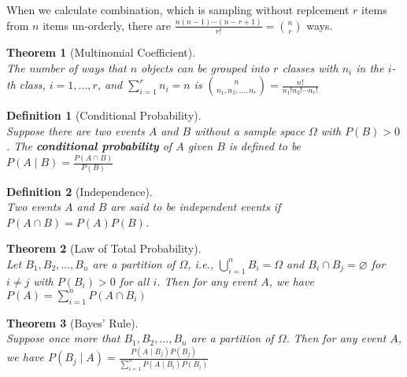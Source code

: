 \documentclass[12pt]{article}
\newtheorem{definition}{Definition}[section]
\newtheorem{theorem}{Theorem}[section]
\theoremstyle{definition}
\begin{document}
When we calculate combination, which is sampling without replcement $r$ items from $n$ items un-orderly,
there are
$
\frac{n(n-1)\cdots(n-r+1)}{r!}=\binom{n}{r}
$
ways.
\begin{theorem}[Multinomial Coefficient]
\hfill\\\normalfont The number of ways that $n$ objects can be grouped into $r$ classes with $n_i$ in the $i$-th class, $i=1,\ldots, r$, and $\sum_{i=1}^r n_i=n$ is
$
\binom{n}{n_1,n_2,\ldots, n_r} = \frac{n!}{n_1!n_2!\cdots n_r!}
$
\end{theorem}
\begin{definition}[Conditional Probability]
\hfill\\\normalfont Suppose there are two events $A$ and $B$ without a sample space $\Omega$ with $P(B)>0$. The \textbf{conditional probability} of $A$ given $B$ is defined to be
$
P(A\mid B) = \frac{P(A\cap B)}{P(B)}
$
\end{definition}
\begin{definition}[Independence]
\hfill\\\normalfont Two events $A$ and $B$ are said to be independent events if $P(A\cap B)=P(A)P(B)$.
\end{definition}
\begin{theorem}[Law of Total Probability]
\hfill\\\normalfont Let $B_1, B_2, \ldots, B_n$ are a partition of $\Omega$, i.e., $\bigcup_{i=1}^n B_i=\Omega$ and $B_i\cap B_j=\varnothing$ for $i\neq j$ with $P(B_i)>0$ for all $i$. Then for any event $A$, we have
$
P(A)=\sum_{i=1}^n P(A\cap B_i)
$
\end{theorem}
\begin{theorem}[Bayes' Rule]
\hfill\\\normalfont Suppose once more that $B_1, B_2,\ldots, B_n$ are a partition of $\Omega$. Then for any event $A$, we have
$
P(B_j\mid A) = \frac{P(A\mid B_j)P(B_j)}{\sum_{i=1}^n P(A\mid B_i)P(B_i)}
$
\end{theorem}
\end{document}
